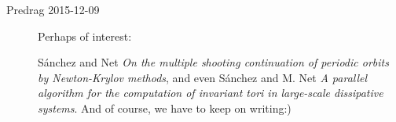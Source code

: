 \begin{description}
\item[Predrag 2015-12-09]
Perhaps of interest:

S\'anchez and Net
{\em On the multiple shooting continuation
         of periodic orbits by {Newton-Krylov} methods},
and even S\'anchez and M. Net
{\em A parallel algorithm for the computation of invariant tori
         in large-scale dissipative systems}.
And of course, we have to keep on writing:)




\end{description}
